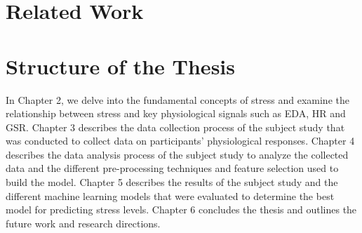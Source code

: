 \section{Related Work}
\begin{comment}
\subsection*{Physiological indicators of mental stress}
ome studies focus on reviewing the current state of affairs related to human stress detection. For instance, a review on human stress detection using bio-signals is presented in (Giannakakis et al., 2019). However, a discussion about the psychological, physical, and behavioral measures of human stress is found lacking. Further, publicly available databases for human stress measurement were also not explored. In another study, objective, subjective, physical, and behavioral measures for stress detection, as well as publicly available data used for human stress, are discussed. Another application-specific human stress measurement survey focusing on driver stress level is presented in (Rastgoo et al., 2018). Physical and physiological measures o

Mental Stress Detection using Data from Wearable and Non-Wearable Sensors: A Review 5 human stress for driver stress detection are explored in detail. The limitation of this survey is that it only discusses a specific application i.e., driver stress level, and is not generic.

\subsection*{Robots and stress}
\end{comment}


\section{Structure of the Thesis}
  In Chapter 2, we delve into the fundamental concepts of stress and examine the relationship between stress and key physiological signals such as \gls{EDA}, \gls{HR} and \gls{GSR}. Chapter 3 describes the data collection process of the subject study that was conducted to collect data on participants' physiological responses. Chapter 4 describes the data analysis process of the subject study  to analyze the collected data and the different pre-processing techniques and feature selection used to build the model. Chapter 5 describes the results of the subject study and the different machine learning models that were evaluated to determine the best model for predicting stress levels. Chapter 6 concludes the thesis and outlines the future work and research directions.
  

  
 
 